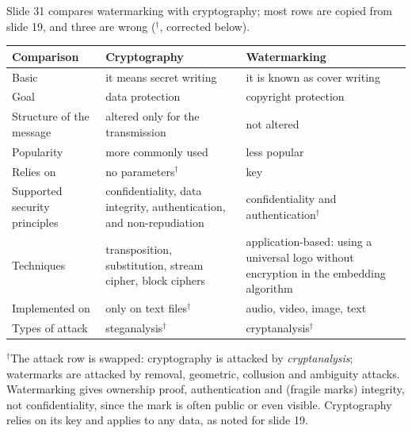 Slide 31 compares watermarking with cryptography; most rows are copied from slide 19, and three are wrong ($^\dagger$, corrected below).
\begin{center}\small
\begin{tabularx}{\textwidth}{@{}l X X@{}}
\toprule
Comparison & Cryptography & Watermarking\\
\midrule
Basic & it means secret writing & it is known as cover writing\\
Goal & data protection & copyright protection\\
Structure of the message & altered only for the transmission & not altered\\
Popularity & more commonly used & less popular\\
Relies on & no parameters$^\dagger$ & key\\
Supported security principles & confidentiality, data integrity, authentication, and non-repudiation & confidentiality and authentication$^\dagger$\\
Techniques & transposition, substitution, stream cipher, block ciphers & application-based: using a universal logo without encryption in the embedding algorithm\\
Implemented on & only on text files$^\dagger$ & audio, video, image, text\\
Types of attack & steganalysis$^\dagger$ & cryptanalysis$^\dagger$\\
\bottomrule
\end{tabularx}
\end{center}
$^\dagger$The attack row is swapped: cryptography is attacked by \emph{cryptanalysis}; watermarks are attacked by removal, geometric, collusion and ambiguity attacks. Watermarking gives ownership proof, authentication and (fragile marks) integrity, not confidentiality, since the mark is often public or even visible. Cryptography relies on its key and applies to any data, as noted for slide 19.

